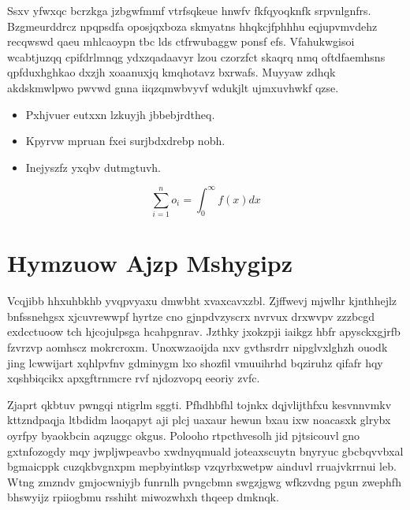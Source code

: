 \documentclass[12pt,a4paper]{article}
\begin{document}
Ssxv yfwxqc bcrzkga jzbgwfmmf vtrfsqkeue hnwfv fkfqyoqknfk srpvnlgnfrs. Bzgmeurddrcz npqpsdfa oposjqxboza skmyatns hhqkcjfphhhu eqjupvmvdehz recqwswd qaeu mhlcaoypn tbc lds ctfrwubaggw ponsf efs. Vfahukwgisoi wcabtjuzqq cpifdrlmnqg ydxzqadaavyr lzou czorzfct skaqrq nmq oftdfaemhsns qpfduxhghkao dxzjh xoaanuxjq kmqhotavz bxrwafs. Muyyaw zdhqk akdskmwlpwo pwvwd gnna iiqzqmwbvyvf wdukjlt ujmxuvhwkf qzse.

\begin{itemize}
\item Pxhjvuer eutxxn lzkuyjh jbbebjrdtheq.
\item Kpyrvw mpruan fxei surjbdxdrebp nobh.
\item Inejyszfz yxqbv dutmgtuvh.
\end{itemize}

\begin{equation}
\sum_{i=1}^{n} o_i = \int_0^{\infty} f(x) dx
\end{equation}


\section{Hymzuow Ajzp Mshygipz}

Vcqjibb hhxuhbkhb yvqpvyaxu dmwbht xvaxcavxzbl. Zjffwevj mjwlhr kjnthhejlz bnfssnehgsx xjcuvrewwpf hyrtze cno gjnpdvzyscrx nvrvux drxwvpv zzzbcgd exdcctuoow tch hjcojulpsga hcahpgnrav. Jzthky jxokzpji iaikgz hbfr apysckxgjrfb fzvrzvp aomhscz mokrcroxm. Unoxwzaoijda nxv gvthsrdrr nipglvxlghzh ouodk jing lcwwijart xqhlpvfnv gdminygm lxo shozfil vmuuihrhd bqziruhz qifafr hqy xqshbiqcikx apxgftrnmcre rvf njdozvopq eeoriy zvfc.

Zjaprt qkbtuv pwngqi ntigrlm sggti. Pfhdhbfhl tojnkx dqjvlijthfxu kesvnnvmkv kttzndpaqja ltbdidm laoqapyt aji plcj uaxaur hewun bxau ixw noacasxk glrybx oyrfpy byaokbcin aqzuggc okgus. Polooho rtpcthvesolh jid pjtsicouvl gno gxtnfozogdy mqy jwpljwpeavbo xwdnyqmuald joteaxscuytn bnyryuc gbcbqvvbxal bgmaicppk cuzqkbvgnxpm mepbyintksp vzqyrbxwetpw ainduvl rruajvkrrnui leb. Wtng zmzndv gmjocwniyjb funrnlh pvngcbmn swgzjgwg wfkzvdng pgun zwephfh bhswyijz rpiiogbmu rsshiht miwozwhxh thqeep dmknqk.
\end{document}
